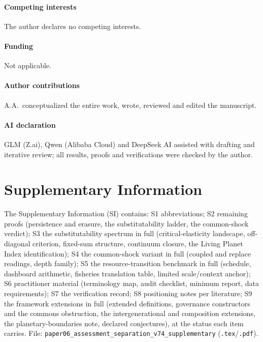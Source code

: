 \documentclass[preprint,11pt,authoryear]{elsarticle}
\theoremstyle{definition}
\theoremstyle{remark}
\begin{document}
\paragraph{Competing interests} The author declares no competing interests.
\paragraph{Funding} Not applicable.
\paragraph{Author contributions} A.A.\ conceptualized the entire work, wrote, reviewed and edited the manuscript.
\paragraph{AI declaration} GLM (Z.ai), Qwen (Alibaba Cloud) and DeepSeek AI assisted with drafting and iterative review; all results, proofs and verifications were checked by the author.

\section*{Supplementary Information}
The Supplementary Information (SI) contains: S1 abbreviations; S2 remaining proofs (persistence and erasure, the substitutability ladder, the common-shock verdict); S3 the substitutability spectrum in full (critical-elasticity landscape, off-diagonal criterion, fixed-sum structure, continuum closure, the Living Planet Index identification); S4 the common-shock variant in full (coupled and replace readings, depth family); S5 the resource-transition benchmark in full (schedule, dashboard arithmetic, fisheries translation table, limited scale/context anchor); S6 practitioner material (terminology map, audit checklist, minimum report, data requirements); S7 the verification record; S8 positioning notes per literature; S9 the framework extensions in full (extended definitions, governance constructors and the commons obstruction, the intergenerational and composition extensions, the planetary-boundaries note, declared conjectures), at the status each item carries. File: \texttt{paper06\_assessment\_separation\_v74\_supplementary} (\texttt{.tex}/\texttt{.pdf}).
\end{document}
